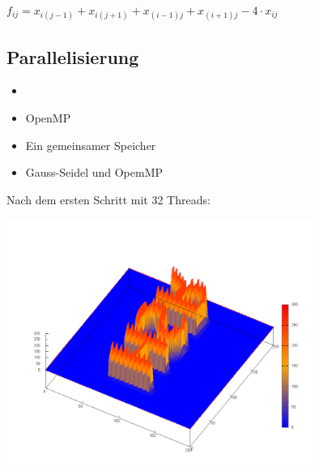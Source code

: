 \begin{frame}
	\scriptsize
	\vspace{3em}
	$f_{ij}= x_{i(j-1)} + x_{i(j+1)} + x_{(i-1)j} + x_{(i+1)j}- 4\cdot x_{ij}$
\end{frame}

\subsection{Parallelisierung}

\begin{frame}
	\begin{itemize}[<+->]
		\item 
		\item OpenMP
		\item Ein gemeinsamer Speicher
		\item Gauss-Seidel und OpemMP
	\end{itemize}
\end{frame}

\begin{frame}
	\centering
	Nach dem ersten Schritt mit 32 Threads:
	
	\includegraphics[width = 10cm]{../skript/images/step001}
\end{frame}